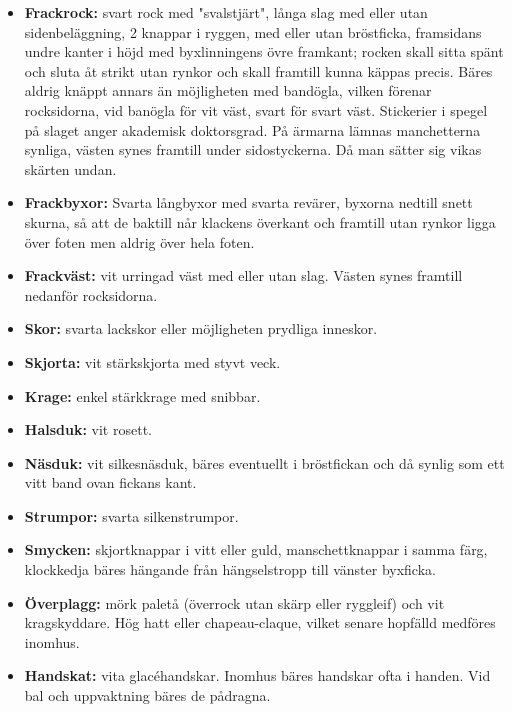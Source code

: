     \begin{itemize}
    
    \item[]\textbf{Frackrock:} svart rock med "svalstjärt", långa slag med eller utan sidenbeläggning, 2 knappar i ryggen, med eller utan bröstficka, framsidans undre kanter i höjd med byxlinningens övre framkant; rocken skall sitta spänt och sluta åt strikt utan rynkor och skall framtill kunna käppas precis. Bäres aldrig knäppt annars än möjligheten med bandögla, vilken förenar rocksidorna, vid banögla för vit väst, svart för svart väst. Stickerier i spegel på slaget anger akademisk doktorsgrad. På ärmarna lämnas manchetterna synliga, västen synes framtill under sidostyckerna. Då man sätter sig vikas skärten undan.

    \item[]\textbf{Frackbyxor:} Svarta långbyxor med svarta revärer, byxorna nedtill snett skurna, så att de baktill når klackens överkant och framtill utan rynkor ligga över foten men aldrig över hela foten.

    \item[]\textbf{Frackväst:} vit urringad väst med eller utan slag. Västen synes framtill nedanför rocksidorna.

    \item[]\textbf{Skor:} svarta lackskor eller möjligheten prydliga inneskor.
    
    \item[]\textbf{Skjorta:} vit stärkskjorta med styvt veck.

    \item[]\textbf{Krage:} enkel stärkkrage med snibbar.

    \item[]\textbf{Halsduk:} vit rosett.

    \item[]\textbf{Näsduk:} vit silkesnäsduk, bäres eventuellt i bröstfickan och då synlig som ett vitt band ovan fickans kant.

    \item[]\textbf{Strumpor:} svarta silkenstrumpor.

    \item[]\textbf{Smycken:} skjortknappar i vitt eller guld, manschettknappar i samma färg, klockkedja bäres hängande från hängselstropp till vänster byxficka.

    \item[]\textbf{Överplagg:} mörk paletå (överrock utan skärp eller ryggleif) och vit kragskyddare. Hög hatt eller chapeau-claque, vilket senare hopfälld medföres inomhus.

    \item[]\textbf{Handskat:} vita glacéhandskar. Inomhus bäres handskar ofta i handen. Vid bal och uppvaktning bäres de pådragna.

    \end{itemize}

